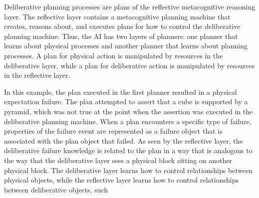Deliberative planning processes are plans of the reflective
metacognitive reasoning layer.  The reflective layer contains a
metacognitive planning machine that creates, reasons about, and
executes plans for how to control the deliberative planning machine.
Thus, the AI has two layers of planners: one planner that learns about
physical processes and another planner that learns about planning
processes.  A plan for physical action is manipulated by resources in
the deliberative layer, while a plan for deliberative action is
manipulated by resources in the reflective layer.

In this example, the plan executed in the first planner resulted in a
physical expectation failure.  The plan attempted to assert that a
cube is supported by a pyramid, which was not true at the point when
the assertion was executed in the deliberative planning machine.  When
a plan encounters a specific type of failure, properties of the
failure event are represented as a failure object that is associated
with the plan object that failed.  As seen by the reflective layer,
the deliberative failure knowledge is related to the plan in a way
that is analogous to the way that the deliberative layer sees a
physical block sitting on another physical block.  The deliberative
layer learns how to control relationships between physical objects,
while the reflective layer learns how to control relationships between
deliberative objects, such
